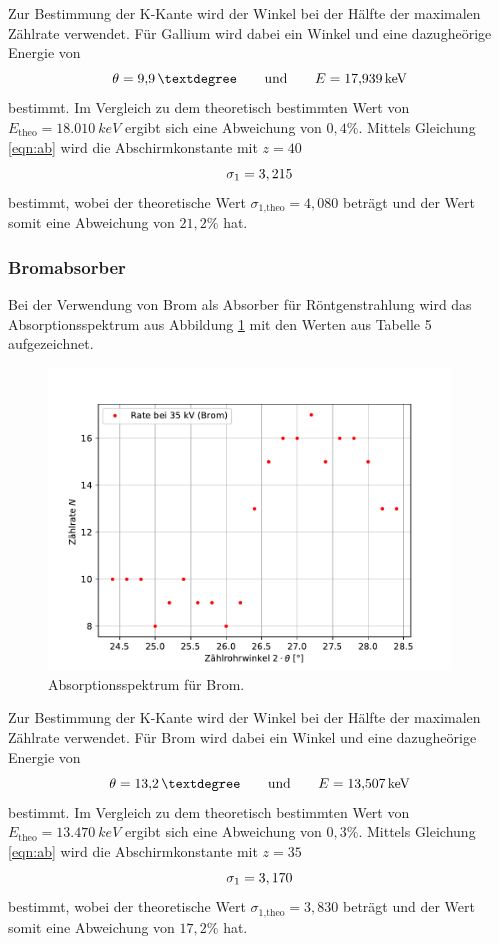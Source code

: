 Zur Bestimmung der K-Kante wird der Winkel bei der Hälfte der maximalen Zählrate verwendet.
Für Gallium wird dabei ein Winkel und eine dazugheörige Energie von
\begin{equation}
    \theta = \SI{9,9}{°} \qquad \text{und} \qquad E = \SI{17,939}{keV}  \notag
\end{equation}
bestimmt.
Im Vergleich zu dem theoretisch bestimmten Wert von $E_\text{theo} = \SI{18,010}{keV}$ ergibt sich eine Abweichung von $0,4\%$.
Mittels Gleichung \ref{eqn:ab} wird die Abschirmkonstante mit $z = 40$
\begin{equation}
    \sigma_1 = 3,215   \notag
\end{equation}
bestimmt, wobei der theoretische Wert $\sigma_\text{1,theo} = 4,080$ beträgt und der Wert somit eine Abweichung von $21,2 \%$ hat.

\subsubsection{Bromabsorber}
Bei der Verwendung von Brom als Absorber für Röntgenstrahlung wird das Absorptionsspektrum aus Abbildung \ref{fig:Brom} mit den Werten aus Tabelle 5 aufgezeichnet.

\begin{figure}[h!]
    \centering
    \includegraphics[height=8cm]{Auswertung/Brom.pdf}
    \caption{Absorptionsspektrum für Brom.}
    \label{fig:Brom}
\end{figure}

Zur Bestimmung der K-Kante wird der Winkel bei der Hälfte der maximalen Zählrate verwendet.
Für Brom wird dabei ein Winkel und eine dazugheörige Energie von
\begin{equation}
    \theta = \SI{13,2}{°} \qquad \text{und} \qquad E = \SI{13,507}{keV}  \notag
\end{equation}
bestimmt.
Im Vergleich zu dem theoretisch bestimmten Wert von $E_\text{theo} = \SI{13,470}{keV}$ ergibt sich eine Abweichung von $0,3\%$.
Mittels Gleichung \ref{eqn:ab} wird die Abschirmkonstante mit $z = 35$
\begin{equation}
    \sigma_1 = 3,170  \notag
\end{equation}
bestimmt, wobei der theoretische Wert $\sigma_\text{1,theo} = 3,830$ beträgt und der Wert somit eine Abweichung von $17,2 \%$ hat.

